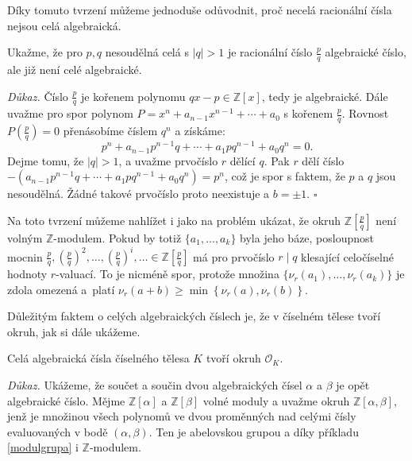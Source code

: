 \documentclass [12pt]{report}
\begin{document}
Díky tomuto tvrzení můžeme jednoduše odůvodnit, proč necelá racionální čísla nejsou celá algebraická.
\begin{priklad}\label{racalg}
Ukažme, že pro $p,q$ nesoudělná celá s $\vert q\vert > 1$ je racionální číslo $\frac{p}{q}$ algebraické číslo, ale již není celé algebraické.
\end{priklad}
\noindent \textit{Důkaz.} Číslo $\frac{p}{q}$ je kořenem polynomu $qx-p \in \mathbb{Z}[x]$, tedy je algebraické. Dále uvažme pro spor polynom $P = x^n + a_{n-1} x^{n-1} + \cdots  + a_0$ s kořenem $\frac{p}{q}$. Rovnost $P\left(\frac{p}{q} \right)=0$ přenásobíme číslem $q^n$ a získáme:
\begin{equation*}
p^n + a_{n-1} p^{n-1} q + \cdots + a_1 p q^{n-1} + a_0 q^n = 0.
\end{equation*}
Dejme tomu, že $\vert q \vert > 1$, a uvažme prvočíslo $r$ dělící $q$. Pak $r$ dělí číslo $-(a_{n-1} p^{n-1} q + \cdots + a_1 p q^{n-1} + a_0 q^n) = p^n$, což je spor s faktem, že $p$ a $q$ jsou nesoudělná. Žádné takové prvočíslo proto neexistuje a $b = \pm 1$. \hfill $\square$ 

\begin{poznamka}
Na toto tvrzení můžeme nahlížet i jako na problém ukázat, že okruh $\mathbb{Z}\left[\frac{p}{q}\right]$ není volným $\mathbb{Z}$-modulem. Pokud by totiž $\lbrace a_1,\dots,a_k \rbrace$ byla jeho báze, posloupnost mocnin $\frac{p}{q}, \left(\frac{p}{q}\right)^2, \dots, \left(\frac{p}{q}\right)^i, \dots \in \mathbb{Z}\left[\frac{p}{q}\right]$ má pro prvočíslo $r \mid q$ klesající celočíselné hodnoty $r$-valuací. To je nicméně spor, protože množina $\lbrace \nu_r(a_1),\dots,\nu_r(a_k) \rbrace$ je zdola omezená a~platí $\nu_r(a+b) \geqslant \min\left\lbrace\nu_r(a),\nu_r(b)\right\rbrace$.
\end{poznamka}

Důležitým faktem o celých algebraických číslech je, že v číselném tělese tvoří okruh, jak si dále ukážeme.

\begin{veta}
Celá algebraická čísla číselného tělesa $K$ tvoří okruh $\mathcal{O}_K$.
\end{veta}
\noindent \textit{Důkaz.} Ukážeme, že součet a součin dvou algebraických čísel $\alpha$ a $\beta$ je opět algebraické číslo. Mějme $\mathbb{Z}[\alpha]$ a $\mathbb{Z}[\beta]$ volné moduly a uvažme okruh $\mathbb{Z}[\alpha,\beta]$, jenž je množinou všech polynomů ve dvou proměnných nad celými čísly evaluovaných v bodě $(\alpha,\beta)$. Ten je abelovskou grupou a díky příkladu \ref{modulgrupa} i $\mathbb{Z}$-modulem.\\
\end{document}

